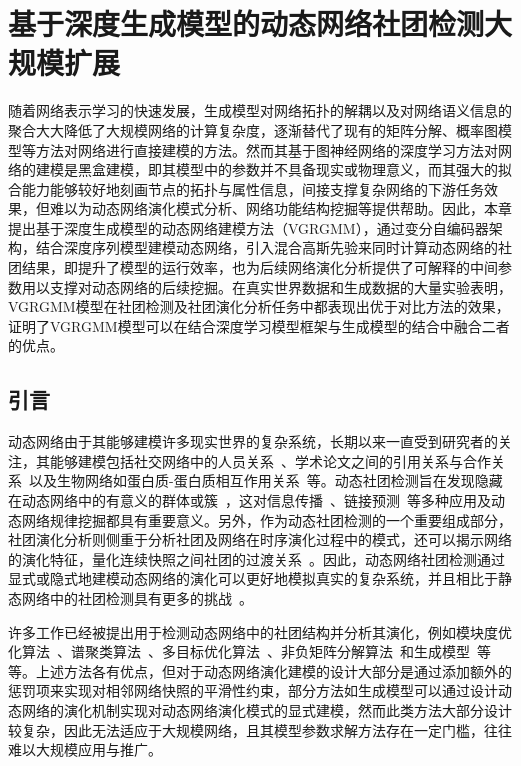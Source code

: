 \baselineskip 20pt


\chapter{基于深度生成模型的动态网络社团检测大规模扩展}
\label{chap:6}

随着网络表示学习的快速发展，生成模型对网络拓扑的解耦以及对网络语义信息的聚合大大降低了大规模网络的计算复杂度，逐渐替代了现有的矩阵分解、概率图模型等方法对网络进行直接建模的方法。然而其基于图神经网络的深度学习方法对网络的建模是黑盒建模，即其模型中的参数并不具备现实或物理意义，而其强大的拟合能力能够较好地刻画节点的拓扑与属性信息，间接支撑复杂网络的下游任务效果，但难以为动态网络演化模式分析、网络功能结构挖掘等提供帮助。因此，本章提出基于深度生成模型的动态网络建模方法（VGRGMM），通过变分自编码器架构，结合深度序列模型建模动态网络，引入混合高斯先验来同时计算动态网络的社团结果，即提升了模型的运行效率，也为后续网络演化分析提供了可解释的中间参数用以支撑对动态网络的后续挖掘。在真实世界数据和生成数据的大量实验表明，VGRGMM模型在社团检测及社团演化分析任务中都表现出优于对比方法的效果，证明了VGRGMM模型可以在结合深度学习模型框架与生成模型的结合中融合二者的优点。



\section{引言\label{chap6:intro}}


动态网络由于其能够建模许多现实世界的复杂系统，长期以来一直受到研究者的关注，其能够建模包括社交网络中的人员关系~\cite{newman2004finding}、学术论文之间的引用关系与合作关系~\cite{gopalan2013efficient,chikhaoui2015new}以及生物网络如蛋白质-蛋白质相互作用关系~\cite{palla2005uncovering,zhang2019relational}等。动态社团检测旨在发现隐藏在动态网络中的有意义的群体或簇~\cite{7384503,rossetti2018community}，这对信息传播~\cite{del2016spreading}、链接预测~\cite{lu2015toward,yu2017link,Ma.2019.Ming}等多种应用及动态网络规律\cite{laurienti2009modularity}挖掘都具有重要意义。另外，作为动态社团检测的一个重要组成部分，社团演化分析则侧重于分析社团及网络在时序演化过程中的模式，还可以揭示网络的演化特征，量化连续快照之间社团的过渡关系~\cite{tang2014detecting}。因此，动态网络社团检测通过显式或隐式地建模动态网络的演化可以更好地模拟真实的复杂系统，并且相比于静态网络中的社团检测具有更多的挑战~\cite{rossetti2018community}。


许多工作已经被提出用于检测动态网络中的社团结构并分析其演化，例如模块度优化算法~\cite{Mucha.2010.Onnela}、谱聚类算法~\cite{liu2018global}、多目标优化算法~\cite{Zhang.2017.Niu,Zhang.2020.Jin}、非负矩阵分解算法~\cite{Ma.2017.Dong}和生成模型~\cite{pensky2019spectral}等等。上述方法各有优点，但对于动态网络演化建模的设计大部分是通过添加额外的惩罚项来实现对相邻网络快照的平滑性约束，部分方法如生成模型可以通过设计动态网络的演化机制实现对动态网络演化模式的显式建模，然而此类方法大部分设计较复杂，因此无法适应于大规模网络，且其模型参数求解方法存在一定门槛，往往难以大规模应用与推广。


